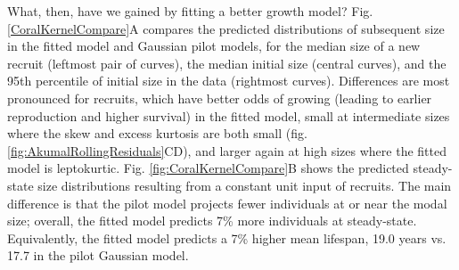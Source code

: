 \documentclass[11pt]{article}
\begin{document}
{What, then, have we gained by fitting a better growth model? Fig. \ref{CoralKernelCompare}A
compares the predicted distributions of subsequent size in the fitted model and Gaussian pilot models, for the median size of a new recruit 
(leftmost pair of curves), the median initial size (central curves), and the 95th percentile of initial size in the data (rightmost
curves). Differences are most pronounced for recruits, which have better odds of growing (leading to earlier reproduction and higher
survival) in the fitted model, small at intermediate sizes where the skew and excess kurtosis are both small (fig. \ref{fig:AkumalRollingResiduals}CD),
and larger again at high sizes where the fitted model is leptokurtic. Fig. \ref{fig:CoralKernelCompare}B shows the predicted steady-state size
distributions resulting from a constant unit input of recruits. The main difference is that the pilot model projects fewer individuals at
or near the modal size; overall, the fitted model predicts 7\% more individuals at steady-state. Equivalently, the fitted
model predicts a 7\% higher mean lifespan, 19.0 years vs. 17.7 in the pilot Gaussian model. 

}
\end{document}
